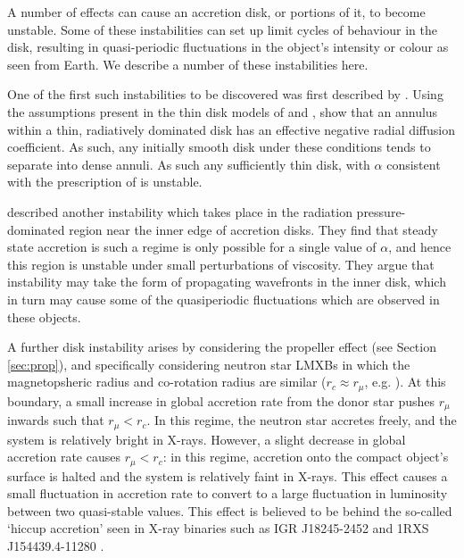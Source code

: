 \par A number of effects can cause an accretion disk, or portions of it, to become unstable.  Some of these instabilities can set up limit cycles of behaviour in the disk, resulting in quasi-periodic fluctuations in the object's intensity or colour as seen from Earth.  We describe a number of these instabilities here.
\par One of the first such instabilities to be discovered was first described by \citealp{Lightman_Instability}.  Using the assumptions present in the thin disk models of \citet{Shakura_Disk} and \citet{Novikov_Torque}, \citeauthor{Lightman_Instability} show that an annulus within a thin, radiatively dominated disk has an effective negative radial diffusion coefficient.  As such, any initially smooth disk under these conditions tends to separate into dense annuli.  As such any sufficiently thin disk, with $\alpha$ consistent with the prescription of \citet{Shakura_Disk} is unstable.
\par \citet{Shakura_Instab} described another instability which takes place in the radiation pressure-dominated region near the inner edge of accretion disks.  They find that steady state accretion is such a regime is only possible for a single value of $\alpha$, and hence this region is unstable under small perturbations of viscosity.  They argue that instability may take the form of propagating wavefronts in the inner disk, which in turn may cause some of the quasiperiodic fluctuations which are observed in these objects.
\par A further disk instability arises by considering the propeller effect (see Section \ref{sec:prop}), and specifically considering neutron star LMXBs in which the magnetopsheric radius and co-rotation radius are similar ($r_c\approx r_\mu$, e.g. \citealp{Spruit_Type2Mod}).  At this boundary, a small increase in global accretion rate from the donor star pushes $r_\mu$ inwards such that $r_\mu<r_c$.  In this regime, the neutron star accretes freely, and the system is relatively bright in X-rays.  However, a slight decrease in global accretion rate causes $r_\mu<r_c$: in this regime, accretion onto the compact object's surface is halted and the system is relatively faint in X-rays.  This effect causes a small fluctuation in accretion rate to convert to a large fluctuation in luminosity between two quasi-stable values.  This effect is believed to be behind the so-called `hiccup accretion' seen in X-ray binaries such as IGR J18245-2452 \citep{Ferrigno_TMSPVar} and 1RXS J154439.4-11280 \citep{Bogdanov_Proxy}.

